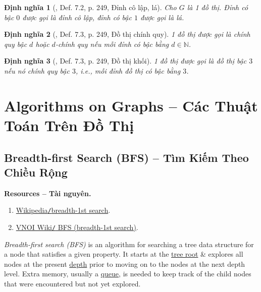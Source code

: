 \documentclass[oneside]{book}
\newtheorem{dinhnghia}{Định nghĩa}
\begin{document}
\begin{dinhnghia}[\cite{Ha_Thanh_to_hop}, Def. 7.2, p. 249, Đỉnh cô lập, lá]
	Cho $G$ là 1 đồ thị. Đỉnh có bậc $0$ được gọi là {\rm đỉnh cô lập}, đỉnh có bậc $1$ được gọi là {\rm lá}.
\end{dinhnghia}

\begin{dinhnghia}[\cite{Ha_Thanh_to_hop}, Def. 7.3, p. 249, Đồ thị chính quy]
	1 đồ thị được gọi là {\rm chính quy bậc $d$} hoặc {\rm$d$-chính quy} nếu mỗi đỉnh có bậc bằng $d\in\mathbb{N}$.
\end{dinhnghia}

\begin{dinhnghia}[\cite{Ha_Thanh_to_hop}, Def. 7.3, p. 249, Đồ thị khối]
	1 đồ thị được gọi là {\rm đồ thị bậc $3$} nếu nó chính quy bậc $3$, i.e., mỗi đỉnh đồ thị có bậc bằng $3$.
\end{dinhnghia}


\chapter{Algorithms on Graphs -- Các Thuật Toán Trên Đồ Thị}


\section{Breadth-first Search (BFS) -- Tìm Kiếm Theo Chiều Rộng}
\textbf{\textsf{Resources -- Tài nguyên.}}
\begin{enumerate}
	\item \href{https://en.wikipedia.org/wiki/Breadth-first_search}{Wikipedia{\tt/}breadth-1st search}.
	\item \href{https://wiki.vnoi.info/algo/graph-theory/breadth-first-search.md}{VNOI Wiki{\tt/} BFS (breadth-1st search)}.
\end{enumerate}
{\it Breadth-first search (BFS)} is an algorithm for searching a tree data structure for a node that satisfies a given property. It starts at the \href{https://en.wikipedia.org/wiki/Tree_(data_structure)#Terminology}{tree root} \& explores all nodes at the present \href{https://en.wikipedia.org/wiki/Tree_(data_structure)#Terminology}{depth} prior to moving on to the nodes at the next depth level. Extra memory, usually a \href{https://en.wikipedia.org/wiki/Queue_(data_structure)}{queue}, is needed to keep track of the child nodes that were encountered but not yet explored.
\end{document}
